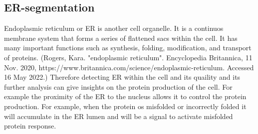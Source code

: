 \subsection{ER-segmentation}
Endoplasmic reticulum or ER is another cell organelle. It is a continuos membrane system that forms a series of flattened sacs within the cell. It has many important functions such as synthesis, folding, modification, and transport of proteins. (Rogers, Kara. "endoplasmic reticulum". Encyclopedia Britannica, 11 Nov. 2020, https://www.britannica.com/science/endoplasmic-reticulum. Accessed 16 May 2022.) Therefore detecting ER within the cell and its quaility and its further analysis can give insights on the protein production of the cell. For example the proximity of the ER to the nucleus allows it to control the protein production. For example, when the protein os misfolded or incorrectly folded it will accumulate in the ER lumen and will be a signal to activate misfolded protein response. 

